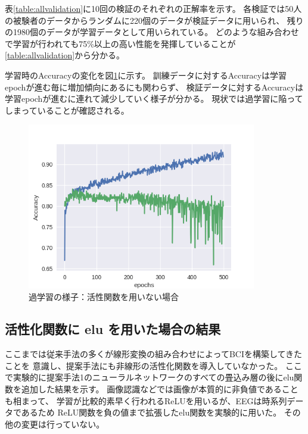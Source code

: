 表\ref{table:allvalidation}に10回の検証のそれぞれの正解率を示す。
各検証では50人の被験者のデータからランダムに220個のデータが検証データに用いられ、
残りの1980個のデータが学習データとして用いられている。
どのような組み合わせで学習が行われても75\%以上の高い性能を発揮していることが\ref{table:allvalidation}から分かる。
\begin{table}[t]
    \centering
    \caption{10交差検証の内訳}
    \label{table:allvalidation}
\end{table}

学習時のAccuracyの変化を図\ref{fig:overfit1}に示す。
訓練データに対するAccuracyは学習epochが進む毎に増加傾向にあるにも関わらず、
検証データに対するAccuracyは学習epochが進むに連れて減少していく様子が分かる。
現状では過学習に陥ってしまっていることが確認される。
\begin{figure}[t]
    \centering
    \includegraphics[width=10cm]{images/linearof.png}
    \caption{過学習の様子：活性関数を用いない場合}
    \label{fig:overfit1}
\end{figure}


\subsection{\mc 活性化関数に \rm elu \mc を用いた場合の結果}
ここまでは従来手法の多くが線形変換の組み合わせによってBCIを構築してきたことを
意識し、提案手法にも非線形の活性化関数を導入していなかった。
ここで実験的に提案手法1のニューラルネットワークのすべての畳込み層の後にelu関数を追加した結果を示す。
画像認識などでは画像が本質的に非負値であることも相まって、
学習が比較的素早く行われるReLUを用いるが、EEGは時系列データであるため
ReLU関数を負の値まで拡張したelu関数を実験的に用いた。
その他の変更は行っていない。

